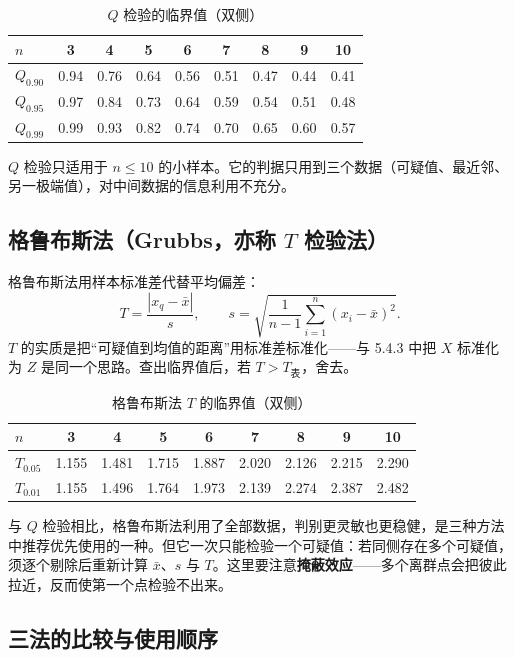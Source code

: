 \documentclass[UTF8]{ctexbook}
\begin{document}
\begin{table}[H]
  \centering
  \caption{$Q$ 检验的临界值（双侧）}
  \begin{tabular}{lcccccccc}
    \toprule
    $n$ & 3 & 4 & 5 & 6 & 7 & 8 & 9 & 10 \\
    \midrule
    $Q_{0.90}$ & 0.94 & 0.76 & 0.64 & 0.56 & 0.51 & 0.47 & 0.44 & 0.41 \\
    $Q_{0.95}$ & 0.97 & 0.84 & 0.73 & 0.64 & 0.59 & 0.54 & 0.51 & 0.48 \\
    $Q_{0.99}$ & 0.99 & 0.93 & 0.82 & 0.74 & 0.70 & 0.65 & 0.60 & 0.57 \\
    \bottomrule
  \end{tabular}
\end{table}

$Q$ 检验只适用于 $n\le 10$ 的小样本。它的判据只用到三个数据（可疑值、最近邻、另一极端值），对中间数据的信息利用不充分。

\subsection{格鲁布斯法（Grubbs，亦称 $T$ 检验法）}

格鲁布斯法用样本标准差代替平均偏差：
\[
T=\frac{|x_q-\bar x|}{s},
\qquad
s=\sqrt{\frac{1}{n-1}\sum_{i=1}^{n}(x_i-\bar x)^2}.
\]
$T$ 的实质是把“可疑值到均值的距离”用标准差标准化——与 5.4.3 中把 $X$ 标准化为 $Z$ 是同一个思路。查出临界值后，若 $T>T_{\text{表}}$，舍去。

\begin{table}[H]
  \centering
  \caption{格鲁布斯法 $T$ 的临界值（双侧）}
  \begin{tabular}{lcccccccc}
    \toprule
    $n$ & 3 & 4 & 5 & 6 & 7 & 8 & 9 & 10 \\
    \midrule
    $T_{0.05}$ & 1.155 & 1.481 & 1.715 & 1.887 & 2.020 & 2.126 & 2.215 & 2.290 \\
    $T_{0.01}$ & 1.155 & 1.496 & 1.764 & 1.973 & 2.139 & 2.274 & 2.387 & 2.482 \\
    \bottomrule
  \end{tabular}
\end{table}

与 $Q$ 检验相比，格鲁布斯法利用了全部数据，判别更灵敏也更稳健，是三种方法中推荐优先使用的一种。但它一次只能检验一个可疑值：若同侧存在多个可疑值，须逐个剔除后重新计算 $\bar x$、$s$ 与 $T$。这里要注意\textbf{掩蔽效应}——多个离群点会把彼此拉近，反而使第一个点检验不出来。

\subsection{三法的比较与使用顺序}
\end{document}
